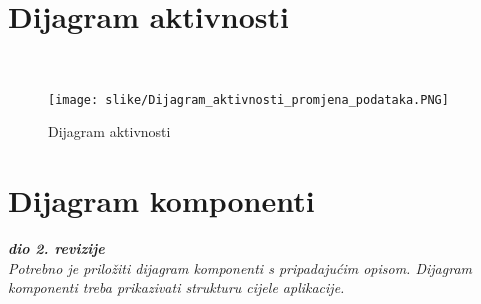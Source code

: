 			\section{Dijagram aktivnosti}
			
			\textbf{\textit{}}\\
			
			\begin{figure}[H]
				\texttt{[image: slike/Dijagram\_aktivnosti\_promjena\_podataka.PNG]} %
				\centering
				\caption{Dijagram aktivnosti}
				\label{fig:dijagramAktivnosti}
			\end{figure}
			
			
			\eject 
			\section{Dijagram komponenti}
			
			\textbf{\textit{dio 2. revizije}}\\
			
			\textit{Potrebno je priložiti dijagram komponenti s pripadajućim opisom. Dijagram komponenti treba prikazivati strukturu cijele aplikacije.}
		
